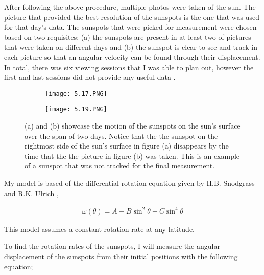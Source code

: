 \documentclass[aps,twocolumn,showpacs,preprintnumbers]{revtex4}
\begin{document}
After following the above procedure, multiple photos were taken of the sun. The picture that provided the best resolution of the sunspots is the one that was used for that day's data. The sunspots that were picked for measurement were chosen based on two requisites: (a) the sunspots are present in at least two of pictures that were taken on different days and (b) the sunspot is clear to see and track in each picture so that an angular velocity can be found through their displacement. In total, there was six viewing sessions that I was able to plan out, however the first and last sessions did not provide any useful data \cite{comment 2}.


\begin{figure}[!h]
\begin{subfigure}
        \centering
         \texttt{[image: 5.17.PNG]}\\
\end{subfigure}
\begin{subfigure}
        \centering
         \texttt{[image: 5.19.PNG]}\\
\end{subfigure}
%
\caption{\label{picture examples} (a) and (b) showcase the motion of the sunspots on the sun's surface over the span of two days. Notice that the the sunspot on the rightmost side of the sun's surface in figure (a) disappears by the time that the the picture in figure (b) was taken. This is an example of a sunspot that was not tracked for the final measurement.}
\end{figure}



My model is based of the differential rotation equation given by H.B. Snodgrass and R.K. Ulrich \cite{snod_1990},

\begin{align}
    \omega(\theta) = A + B\sin^2{\theta} + C\sin^4{\theta}
\end{align}

This model assumes a constant rotation rate at any latitude.

To find the rotation rates of the sunspots, I will measure the angular displacement of the sunspots from their initial positions with the following equation;
\end{document}

